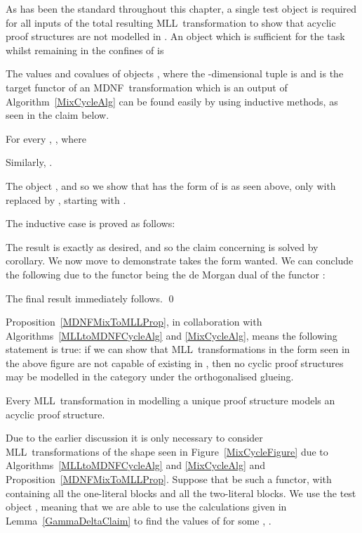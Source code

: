 \documentclass{LMCS}
\theoremstyle{plain}\newtheorem*{cLm}{Claim}
\newcommand{\mll}{MLL} \newcommand{\mall}{MALL}
\begin{document}
    
    As has been the standard throughout this chapter, a single test object is required for all inputs of the total resulting \mll~transformation to show that acyclic proof structures are not modelled in . An object which is sufficient for the task whilst remaining in the confines of  is
    
    
    The values and covalues of objects , where the -dimensional tuple is  and  is the target functor of an MDNF~transformation which is an output of Algorithm~\ref{MixCycleAlg} can be found easily by using inductive methods, as seen in the claim below.
    
    \begin{lem} \label{GammaDeltaClaim}
    For every , , where
    
    Similarly, .
    \end{lem}
    \proof
    The object , and so we show that  has the form of  is as seen above, only with  replaced by , starting with .
    
    The inductive case is proved as follows:
    
    
\enlargethispage{\baselineskip}
\noindent    The result is exactly as desired, and so the claim concerning  is solved by corollary. We now move to demonstrate  takes the form wanted. We can conclude the following due to the functor  being the de Morgan dual of the functor :
    
    The final result immediately follows. \qed
    
    Proposition~\ref{MDNFMixToMLLProp}, in collaboration with Algorithms~\ref{MLLtoMDNFCycleAlg} and \ref{MixCycleAlg}, means the following statement is true: if we can show that \mll~transformations in the form seen in the above figure are not capable of existing in , then no cyclic proof structures may be modelled in the category  under the orthogonalised glueing.
    
    \begin{prop} \label{MixAcyclicLemma}
    Every \mll~transformation in  modelling a unique proof structure models an acyclic proof structure.
    \end{prop}
    \proof
    Due to the earlier discussion it is only necessary to consider \mll~transformations of the shape seen in Figure~\ref{MixCycleFigure} due to Algorithms~\ref{MLLtoMDNFCycleAlg} and \ref{MixCycleAlg} and Proposition~\ref{MDNFMixToMLLProp}. Suppose that  be such a functor, with  containing all the one-literal blocks and  all the two-literal blocks. We use the test object , meaning that we are able to use the calculations given in Lemma~\ref{GammaDeltaClaim} to find the values of  for some , .
    
\end{document}
